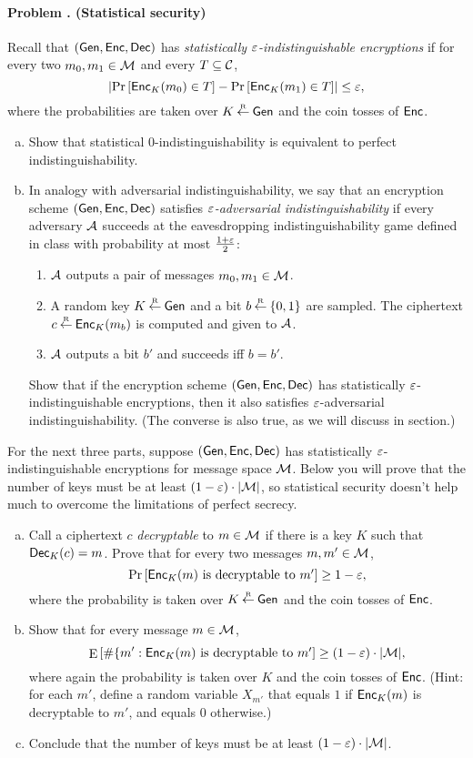 \documentclass[11pt]{article}
\newcounter{problem}
\newenvironment{problem}[1]{\stepcounter{problem}
\paragraph{Problem \theproblem. #1}}{}
\begin{document}
\begin{problem}{(Statistical security)}
Recall that  $(\mathsf{Gen},\mathsf{Enc},\mathsf{Dec})$ has {\em statistically
$\varepsilon$-indistinguishable encryptions} if for every two
$m_0,m_1\in\mathcal{M}$ and every $T\subseteq \mathcal{C}$,
$$\left|\Pr\left[\mathsf{Enc}_K(m_0)\in T\right] - \Pr\left[\mathsf{Enc}_K(m_1)\in T\right]\right| \leq
\varepsilon,$$ where the probabilities are taken over $K\mathbin{\stackrel{\mbox{\tiny R}}{\gets}} \mathsf{Gen}$ and
the coin tosses of $\mathsf{Enc}$.

\begin{enumerate}[a.]
\item Show that statistical $0$-indistinguishability is equivalent
to perfect indistinguishability.

\item In analogy with adversarial indistinguishability, we say that an encryption scheme $(\mathsf{Gen}, \mathsf{Enc}, \mathsf{Dec})$ satisfies \emph{$\varepsilon$-adversarial indistinguishability} if every adversary $\mathcal{A}$ succeeds at the eavesdropping indistinguishability game defined in class with probability at most $\frac{1 + \varepsilon}{2}$:
\begin{enumerate}[1.]
\item $\mathcal{A}$ outputs a pair of messages $m_0, m_1 \in \mathcal{M}$.
\item A random key $K \mathbin{\stackrel{\mbox{\tiny R}}{\gets}} \mathsf{Gen}$ and a bit $b \mathbin{\stackrel{\mbox{\tiny R}}{\gets}} \{0, 1\}$ are sampled. The ciphertext $c \mathbin{\stackrel{\mbox{\tiny R}}{\gets}} \mathsf{Enc}_K(m_b)$ is computed and given to $\mathcal{A}$.
\item $\cal A$ outputs a bit $b'$ and succeeds iff $b = b'$.
\end{enumerate}
Show that if the encryption scheme $(\mathsf{Gen}, \mathsf{Enc}, \mathsf{Dec})$ has statistically $\varepsilon$-indistinguishable encryptions, then it also satisfies $\varepsilon$-adversarial indistinguishability. (The converse is also true, as we will discuss in section.)
\end{enumerate}
For the next three parts, suppose $(\mathsf{Gen},\mathsf{Enc},\mathsf{Dec})$  has
statistically $\varepsilon$-indistinguishable encryptions for message space
$\mathcal{M}$. Below you will prove that the number of keys must be at
least $(1-\varepsilon)\cdot |\mathcal{M}|$, so statistical security doesn't help
much to overcome the limitations of perfect secrecy.

\begin{enumerate}[a.]
\item Call a ciphertext $c$ {\em decryptable} to $m\in \mathcal{M}$ if
there is a key $K$ such that $\mathsf{Dec}_K(c)=m$.  Prove that for every
two messages $m,m'\in\mathcal{M}$,
$$\Pr\left[\mbox{$\mathsf{Enc}_K(m)$ is decryptable to $m'$}\right]\geq 1-\varepsilon,$$
where the probability is taken over $K\mathbin{\stackrel{\mbox{\tiny R}}{\gets}} \mathsf{Gen}$ and the coin
tosses of $\mathsf{Enc}$.

 \item Show that for every message $m\in \mathcal{M}$,
$$\mathop{\mathrm E}\displaylimits\left[\#\{ m' : \mbox{$\mathsf{Enc}_K(m)$ is decryptable to
$m'$}\right] \geq (1-\varepsilon)\cdot |\mathcal{M}|,$$ where again the
probability is taken over $K$ and the coin tosses of $\mathsf{Enc}$. (Hint:
for each $m'$, define a random variable $X_{m'}$ that equals $1$ if
$\mathsf{Enc}_K(m)$ is decryptable to $m'$, and equals $0$ otherwise.)

\item Conclude that the number of keys must be at least
$(1-\varepsilon)\cdot |\mathcal{M}|$.
\end{enumerate}
\end{problem}
\end{document}
